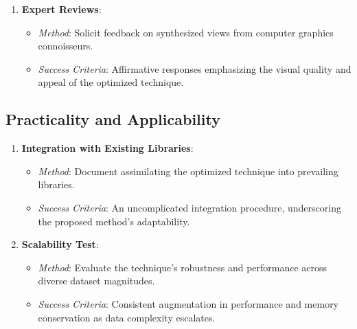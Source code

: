 \documentclass[logo,bsc,singlespacing,parskip]{infthesis}
\begin{document}
\begin{enumerate}
    \item \textbf{Expert Reviews}:
    \begin{itemize}
        \item \textit{Method}: Solicit feedback on synthesized views from computer graphics connoisseurs.
        \item \textit{Success Criteria}: Affirmative responses emphasizing the visual quality and appeal of the optimized technique.
    \end{itemize}

\end{enumerate}

\subsection{Practicality and Applicability}

\begin{enumerate}
    \item \textbf{Integration with Existing Libraries}:
    \begin{itemize}
        \item \textit{Method}: Document assimilating the optimized technique into prevailing libraries.
        \item \textit{Success Criteria}: An uncomplicated integration procedure, underscoring the proposed method's adaptability.
    \end{itemize}

    \item \textbf{Scalability Test}:
    \begin{itemize}
        \item \textit{Method}: Evaluate the technique's robustness and performance across diverse dataset magnitudes.
        \item \textit{Success Criteria}: Consistent augmentation in performance and memory conservation as data complexity escalates.
    \end{itemize}
\end{enumerate}
\end{document}
